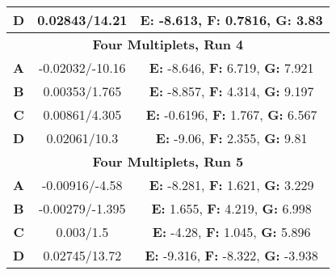 \begin{longtable}[h!]{c c c}
\textbf{D} & 0.02843/14.21 & \textbf{E:} -8.613, \textbf{F:} 0.7816, \textbf{G:} 3.83 \\
\hline
\multicolumn{3}{c}{\textbf{Four Multiplets, Run 4}}\\
\hline
\textbf{A} & -0.02032/-10.16 & \textbf{E:} -8.646, \textbf{F:} 6.719, \textbf{G:} 7.921 \\
\textbf{B} & 0.00353/1.765 & \textbf{E:} -8.857, \textbf{F:} 4.314, \textbf{G:} 9.197 \\
\textbf{C} & 0.00861/4.305 & \textbf{E:} -0.6196, \textbf{F:} 1.767, \textbf{G:} 6.567 \\
\textbf{D} & 0.02061/10.3 & \textbf{E:} -9.06, \textbf{F:} 2.355, \textbf{G:} 9.81 \\
\hline
\multicolumn{3}{c}{\textbf{Four Multiplets, Run 5}}\\
\hline
\textbf{A} & -0.00916/-4.58 & \textbf{E:} -8.281, \textbf{F:} 1.621, \textbf{G:} 3.229 \\
\textbf{B} & -0.00279/-1.395 & \textbf{E:} 1.655, \textbf{F:} 4.219, \textbf{G:} 6.998 \\
\textbf{C} & 0.003/1.5 & \textbf{E:} -4.28, \textbf{F:} 1.045, \textbf{G:} 5.896 \\
\textbf{D} & 0.02745/13.72 & \textbf{E:} -9.316, \textbf{F:} -8.322, \textbf{G:} -3.938 \\


\end{longtable}
